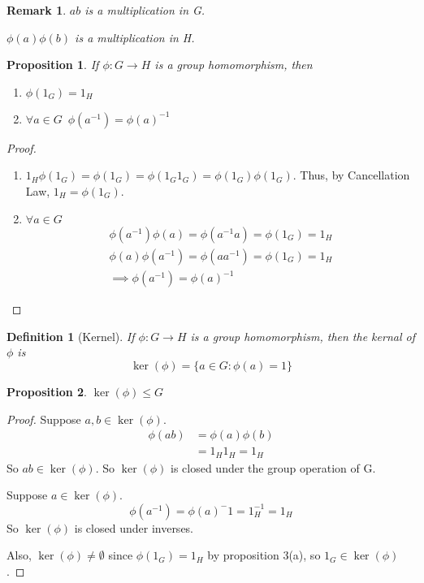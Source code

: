 \documentclass[11pt, oneside]{book}
\theoremstyle{break}
\newtheorem*{proof}{Proof}
\newtheorem{propo}{Proposition}[section]
\newtheorem*{remark}{Remark}
\newtheorem{defn}{Definition}[section]
\begin{document}
\begin{remark}
    $ab$ is a multiplication in G.

    $\phi(a)\phi(b)$ is a multiplication in H.
\end{remark}

\begin{propo}
    If $\phi: G \to H$ is a group homomorphism, then
    \begin{enumerate}
        \item $\phi(1_G) = 1_H$
        \item $\forall a \in G \enspace \phi(a^{-1}) = \phi(a)^{-1}$
    \end{enumerate}
\end{propo}

\begin{proof}
    \begin{enumerate}
        \item $1_H \phi(1_G) = \phi(1_G) = \phi(1_G 1_G) = \phi(1_G)\phi(1_G)$.
            Thus, by Cancellation Law, $1_H = \phi(1_G)$.
        \item $\forall a \in G$
            \begin{gather*}
                \phi(a^{-1})\phi(a) = \phi(a^{-1}a) = \phi(1_G) = 1_H \\
                \phi(a)\phi(a^{-1}) = \phi(aa^{-1}) = \phi(1_G) = 1_H \\
                \implies \phi(a^{-1}) = \phi(a)^{-1}
            \end{gather*}
    \end{enumerate}
\end{proof}

\begin{defn}[Kernel]
    If $\phi: G \to H$ is a group homomorphism, then the kernal of $\phi$ is
    \begin{equation}
        \ker(\phi) = \{a \in G: \phi(a) = 1\}
    \end{equation}
\end{defn}

\begin{propo}
    $\ker(\phi) \leq G$
\end{propo}

\begin{proof}
    Suppose $a, b \in \ker(\phi)$.
    \begin{align*}
        \phi(ab) &= \phi(a)\phi(b) \\
                 &= 1_H 1_H = 1_H
    \end{align*}
    So $ab \in \ker(\phi)$. So $\ker(\phi)$ is closed under the group operation of G.

    Suppose $a \in \ker(\phi)$.
    \begin{equation*}
        \phi(a^{-1}) = \phi(a)^-1 = 1_H^{-1} = 1_H
    \end{equation*}
    So $\ker(\phi)$ is closed under inverses.

    Also, $\ker(\phi) \neq \emptyset$ since $\phi(1_G) = 1_H$ by proposition 3(a), so $1_G \in \ker(\phi)$.
\end{proof}
\end{document}
